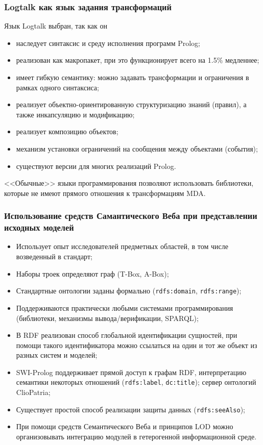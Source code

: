 \documentclass[10pt]{beamer}
\begin{document}
\begin{frame} \frametitle{Logtalk как язык задания трансформаций} Язык Logtalk выбран, так как он \begin{itemize} \item наследует синтаксис и среду исполнения программ Prolog; \item реализован как макропакет, при это функционирует всего на 1.5\% медленнее; \item имеет гибкую семантику: можно задавать трансформации и ограничения в рамках одного синтаксиса; \item реализует объектно-ориентированную структуризацию знаний (правил), а также инкапсуляцию и модификацию; \item реализует композицию объектов; \item механизм установки ограничений на сообщения между объектами (события); \item существуют версии для многих реализаций Prolog. \end{itemize} <<Обычные>> языки программирования позволяют использовать библиотеки, которые не имеют прямого отношения к трансформациям MDA.
\end{frame}

\begin{frame}[fragile]
  \frametitle{Использование средств Самантического Веба при представлении исходных моделей}
  \begin{itemize}
  \item Использует опыт исследователей предметных областей, в том числе возведенный в стандарт;
  \item Наборы троек определяют граф (T-Box, A-Box);
  \item Стандартные онтологии заданы формально (\verb|rdfs:domain|, \verb|rdfs:range|);
  \item Поддерживаются практически любыми системами программирования (библиотеки, механизмы вывода/верификации, SPARQL);
  \item В RDF реализован способ глобальной идентификации сущностей, при помощи такого идентификатора можно ссылаться на один и тот же объект из разных систем и моделей;
  \item SWI-Prolog поддерживает прямой доступ к графам RDF, интерпретацию семантики некоторых отношений (\verb|rdfs:label|, \verb|dc:title|); сервер онтологий ClioPatria;
  \item Существует простой способ реализации защиты данных (\verb|rdfs:seeAlso|);
  \item При помощи средств Семантического Веба и принципов LOD можно организовывать интеграцию модулей в гетерогенной информационной среде.
  \end{itemize}
\end{frame}
\end{document}
